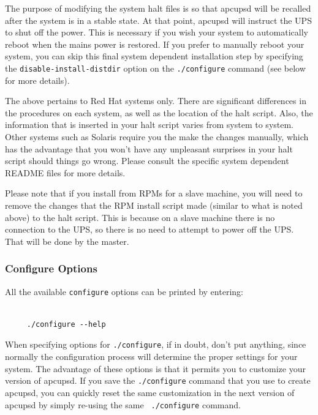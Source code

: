 The purpose of modifying the system halt files is so that apcupsd will be
recalled after the system is in a stable state. At that point, apcupsd will
instruct the UPS to shut off the power. This is necessary if you wish your
system to automatically reboot when the mains power is restored. If you prefer
to manually reboot your system, you can skip this final system dependent
installation step by specifying the {\tt disable-install-distdir} option on
the {\tt ./configure} command (see below for more details).  

The above pertains to Red Hat systems only. There are significant differences
in the procedures on each system, as well as the location of the halt script.
Also, the information that is inserted in your halt script varies from system
to system. Other systems such as Solaris require you the make the changes
manually, which has the advantage that you won't have any unpleasant surprises
in your halt script should things go wrong. Please consult the specific system
dependent README files for more details.  

Please note that if you install from RPMs for a slave machine, you will need
to remove the changes that the RPM install script made (similar to what is
noted above) to the halt script. This is because on a slave machine there is
no connection to the UPS, so there is no need to attempt to power off the UPS.
That will be done by the master. 

\label{Configure-Options}

\subsubsection*{Configure Options}

\label{index-configure-options-24}
\label{index-options_002c-configure-25}
All the available {\tt configure} options can be printed by entering: 

\footnotesize
\begin{verbatim}
     
     ./configure --help
\end{verbatim}
\normalsize

When specifying options for {\tt ./configure}, if in doubt, don't put
anything, since normally the configuration process will determine the proper
settings for your system. The advantage of these options is that it permits
you to customize your version of apcupsd.  If you save the {\tt ./configure}
command that you use to create apcupsd, you can quickly reset the same
customization in the next version of apcupsd by simply re-using the same {\tt
./configure} command.  


